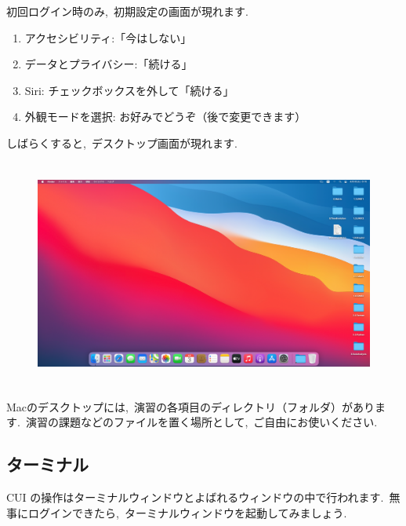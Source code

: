 \documentclass{jarticle}
\begin{document}
初回ログイン時のみ,\ 初期設定の画面が現れます.\ 
\begin{enumerate}
  \item アクセシビリティ:「今はしない」
  \item データとプライバシー:「続ける」
  \item Siri: チェックボックスを外して「続ける」
  \item 外観モードを選択: お好みでどうぞ（後で変更できます）
\end{enumerate}

しばらくすると,\ デスクトップ画面が現れます.\ 
\begin{figure}[H]
  \centering
  \includegraphics[height=7.5cm]{fig/MacDesktop.png}
\end{figure}

Macのデスクトップには,\ 演習の各項目のディレクトリ（フォルダ）があります.\ 
演習の課題などのファイルを置く場所として,\ ご自由にお使いください.\ 

\subsection{ターミナル}
 CUI の操作はターミナルウィンドウとよばれるウィンドウの中で行われます.\ 
 無事にログインできたら,\ ターミナルウィンドウを起動してみましょう.\  

\end{document}
